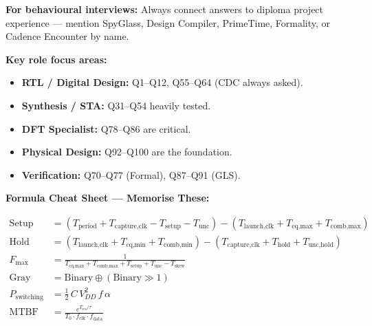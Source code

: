 \documentclass[12pt,a4paper]{article}
\begin{document}
\begin{tipbox}
\textbf{For behavioural interviews:} Always connect answers to diploma project experience --- mention SpyGlass, Design Compiler, PrimeTime, Formality, or Cadence Encounter by name.

\textbf{Key role focus areas:}
\begin{itemize}[noitemsep]
  \item \textbf{RTL / Digital Design:} Q1--Q12, Q55--Q64 (CDC always asked).
  \item \textbf{Synthesis / STA:} Q31--Q54 heavily tested.
  \item \textbf{DFT Specialist:} Q78--Q86 are critical.
  \item \textbf{Physical Design:} Q92--Q100 are the foundation.
  \item \textbf{Verification:} Q70--Q77 (Formal), Q87--Q91 (GLS).
\end{itemize}
\end{tipbox}

\vspace{1em}

\begin{notebox}
\textbf{Formula Cheat Sheet --- Memorise These:}

\begin{align}
\text{Setup Slack} &= (T_{\text{period}} + T_{\text{capture,clk}} - T_{\text{setup}} - T_{\text{unc}})
                    - (T_{\text{launch,clk}} + T_{\text{cq,max}} + T_{\text{comb,max}})\\[4pt]
\text{Hold Slack}  &= (T_{\text{launch,clk}} + T_{\text{cq,min}} + T_{\text{comb,min}})
                    - (T_{\text{capture,clk}} + T_{\text{hold}} + T_{\text{unc,hold}})\\[4pt]
F_{\max}           &= \frac{1}{T_{\text{cq,max}} + T_{\text{comb,max}} + T_{\text{setup}} + T_{\text{unc}} - T_{\text{skew}}}\\[4pt]
\text{Gray Code}   &= \text{Binary} \oplus (\text{Binary} \gg 1)\\[4pt]
P_{\text{switching}}      &= \frac{1}{2}\,C\,V_{DD}^2\,f\,\alpha\\[4pt]
\text{MTBF}        &= \frac{e^{T_{\text{res}}/\tau}}{T_0 \cdot f_{\text{clk}} \cdot f_{\text{data}}}
\end{align}
\end{notebox}
\end{document}
